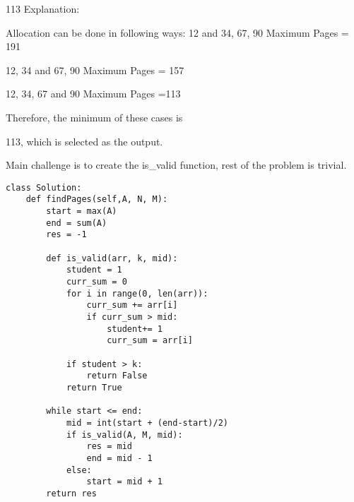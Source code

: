 \documentclass[24pt, a4]{article}
\begin{document}
113
Explanation:

Allocation can be done in following ways:
{12} and {34, 67, 90} Maximum Pages = 191

{12, 34} and {67, 90} Maximum Pages = 157

{12, 34, 67} and {90}  Maximum Pages =113

Therefore, the minimum of these cases is

113, which is selected as the output.

Main challenge is to create the is\_valid function, rest of the problem is
trivial.

\newpage
\begin{lstlisting}
class Solution:
    def findPages(self,A, N, M):
        start = max(A)
        end = sum(A)
        res = -1

        def is_valid(arr, k, mid):
            student = 1
            curr_sum = 0
            for i in range(0, len(arr)):
                curr_sum += arr[i]
                if curr_sum > mid:
                    student+= 1
                    curr_sum = arr[i]

            if student > k:
                return False
            return True

        while start <= end:
            mid = int(start + (end-start)/2)
            if is_valid(A, M, mid):
                res = mid
                end = mid - 1
            else:
                start = mid + 1
        return res
\end{lstlisting}
\end{document}
